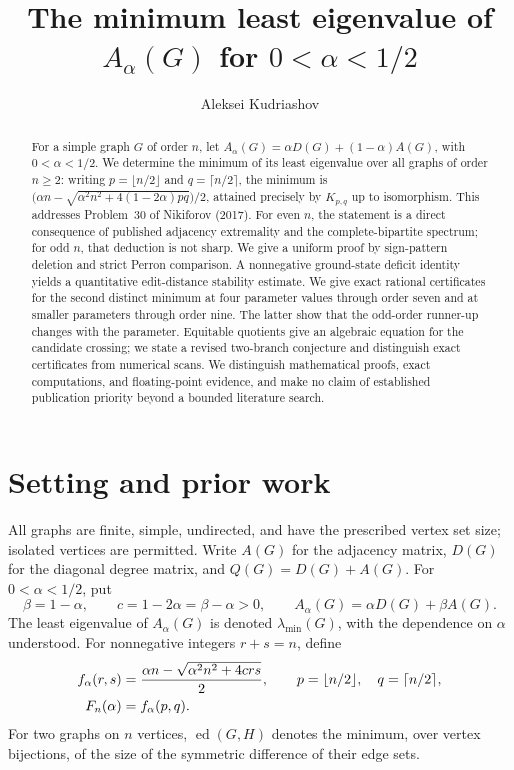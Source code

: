 \documentclass[11pt]{amsart}
\title[Minimum least eigenvalue of $A_\alpha(G)$]{The minimum least eigenvalue of $A_\alpha(G)$ for $0<\alpha<1/2$}
\author{Aleksei Kudriashov}
\theoremstyle{definition}
\newcommand{\Aa}{A_{\alpha}}
\newcommand{\lam}{\lambda_{\min}}
\newcommand{\ee}{\operatorname{ed}}
\begin{document}
\begin{abstract}
For a simple graph $G$ of order $n$, let $A_\alpha(G)=\alpha D(G)+(1-\alpha)A(G)$, with $0<\alpha<1/2$. We determine the minimum of its least eigenvalue over all graphs of order $n\ge2$: writing $p=\lfloor n/2\rfloor$ and $q=\lceil n/2\rceil$, the minimum is
$\bigl(\alpha n-\sqrt{\alpha^2n^2+4(1-2\alpha)pq}\bigr)/2$, attained precisely by $K_{p,q}$ up to isomorphism. This addresses Problem~30 of Nikiforov (2017). For even $n$, the statement is a direct consequence of published adjacency extremality and the complete-bipartite spectrum; for odd $n$, that deduction is not sharp. We give a uniform proof by sign-pattern deletion and strict Perron comparison. A nonnegative ground-state deficit identity yields a quantitative edit-distance stability estimate. We give exact rational certificates for the second distinct minimum at four parameter values through order seven and at smaller parameters through order nine. The latter show that the odd-order runner-up changes with the parameter. Equitable quotients give an algebraic equation for the candidate crossing; we state a revised two-branch conjecture and distinguish exact certificates from numerical scans. We distinguish mathematical proofs, exact computations, and floating-point evidence, and make no claim of established publication priority beyond a bounded literature search.
\end{abstract}
\maketitle

\section{Setting and prior work}
All graphs are finite, simple, undirected, and have the prescribed vertex set size; isolated vertices are permitted. Write $A(G)$ for the adjacency matrix, $D(G)$ for the diagonal degree matrix, and $Q(G)=D(G)+A(G)$. For $0<\alpha<1/2$, put
\begin{equation}\label{eq:params}
 \beta=1-\alpha,\qquad c=1-2\alpha=\beta-\alpha>0,\qquad
 \Aa(G)=\alpha D(G)+\beta A(G).
\end{equation}
The least eigenvalue of $\Aa(G)$ is denoted $\lam(G)$, with the dependence on $\alpha$ understood. For nonnegative integers $r+s=n$, define
\begin{align}\label{eq:f}
 f_\alpha(r,s)&=\frac{\alpha n-\sqrt{\alpha^2n^2+4crs}}2,\qquad
 p=\lfloor n/2\rfloor,\quad q=\lceil n/2\rceil,\notag\\
 F_n(\alpha)&=f_\alpha(p,q).
\end{align}
For two graphs on $n$ vertices, $\ee(G,H)$ denotes the minimum, over vertex bijections, of the size of the symmetric difference of their edge sets.
\end{document}
